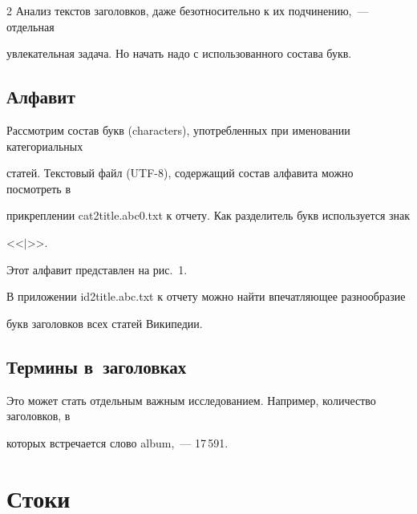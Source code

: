 \begin{multicols}{2}
Анализ текстов заголовков, даже безотносительно к их подчинению,~--- отдельная 

увлекательная задача. Но начать надо с использованного состава букв.



\vspace*{-6pt}



\subsection{Алфавит}



   Рассмотрим состав букв (characters), упо\-треб\-лен\-ных при именовании категориальных 

статей. Текстовый файл (UTF-8), содержащий состав алфавита можно посмотреть в 

прикреплении {\sf cat2title.abc0.txt}  к отчету. Как разделитель букв используется знак 

<<$\vert$>>. %

Этот алфавит представлен на рис.~1.

В приложении {\sf id2title.abc.txt} к отчету можно найти впечатляющее разнообразие 

букв заголовков всех статей Википедии.



\vspace*{-6pt}



\subsection{Термины в~заголовках}



   Это может стать отдельным важным исследованием. Например, количество заголовков, в 

которых встречается слово album,~--- 17\,591. 



\vspace*{-6pt}



\section{Стоки}



\vspace*{-2pt}




\end{multicols}
